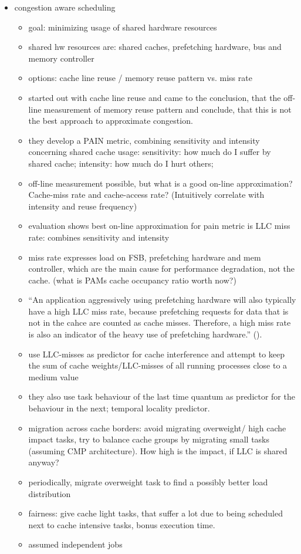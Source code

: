 \begin{itemize}
  \item congestion aware scheduling
    \begin{itemize}
      \item goal: minimizing usage of shared hardware resources
      \item shared hw resources are: shared caches, prefetching hardware, bus
	and memory controller
      \item options: cache line reuse / memory reuse pattern vs. miss rate
      \item \citeauthor{fedorova_managing_2010} started out with cache line
	reuse and came to the conclusion, that the off-line measurement of
	memory reuse pattern and conclude, that this is not the best approach
	to approximate congestion.
      \item they develop a PAIN metric, combining sensitivity and intensity
	concerning shared cache usage: sensitivity: how much do I suffer by
	shared cache; intensity: how much do I hurt others;
      \item off-line measurement possible, but what is a good on-line
	approximation? Cache-miss rate and cache-access rate? (Intuitively
	correlate with intensity and reuse frequency)
      \item evaluation shows best on-line approximation for pain metric is LLC
	miss rate: combines sensitivity and intensity
      \item miss rate expresses load on FSB, prefetching hardware and
	mem controller, which are the main cause for performance degradation,
	not the cache. (what is PAMs cache occupancy ratio worth now?)
      \item ``An application aggressively using prefetching hardware will also
	typically have a high LLC miss rate, because prefetching requests for
	data that is not in the cahce are counted as cache misses. Therefore, a
	high miss rate is also an indicator of the heavy use of prefetching
	hardware.'' (\cite{fedorova_managing_2010}).
      \item \cite{Knauerhase_observing_2007} use LLC-misses as predictor
	for cache interference and attempt to keep the sum of cache
	weights/LLC-misses of all running processes close to a medium value
      \item they also use task behaviour of the last time quantum as predictor
	for the behaviour in the next; temporal locality predictor.
      \item migration across cache borders: avoid migrating overweight/ high
	cache impact tasks, try to balance cache groups by migrating small
	tasks (assuming CMP architecture). How high is the impact, if LLC is
	shared anyway?
      \item periodically, migrate overweight task to find a possibly better
	load distribution
      \item fairness: give cache light tasks, that suffer a lot due to being
	scheduled next to cache intensive tasks, bonus execution time.
      \item assumed independent jobs
    \end{itemize}


\end{itemize}
